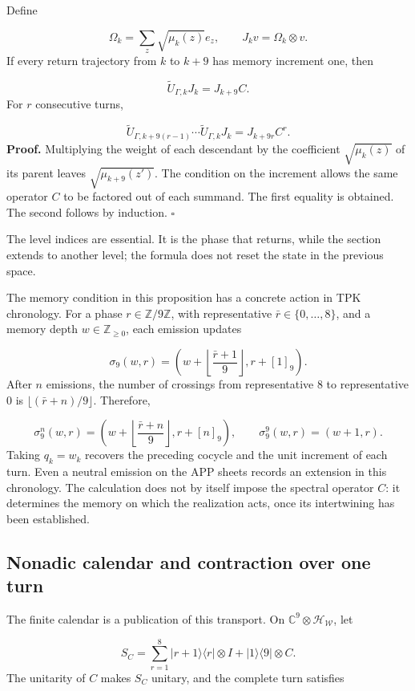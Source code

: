 Define

\[
\Omega_k=\sum_z\sqrt{\mu_k(z)}e_z,\qquad
J_kv=\Omega_k\otimes v.
\]
If every return trajectory from \(k\) to \(k+9\) has memory increment one, then

\[
\widetilde U_{\Gamma,k}J_k=J_{k+9}C.
\]
For \(r\) consecutive turns,

\[
\widetilde U_{\Gamma,k+9(r-1)}\cdots
\widetilde U_{\Gamma,k}J_k=J_{k+9r}C^r.
\]
\textbf{Proof.} Multiplying the weight of each descendant by the coefficient \(\sqrt{\mu_k(z)}\) of its parent leaves \(\sqrt{\mu_{k+9}(z')}\). The condition on the increment allows the same operator \(C\) to be factored out of each summand. The first equality is obtained. The second follows by induction. \hfill\(\square\)

The level indices are essential. It is the phase that returns, while the section extends to another level; the formula does not reset the state in the previous space.

The memory condition in this proposition has a concrete action in TPK chronology. For a phase \(r\in\mathbb Z/9\mathbb Z\), with representative \(\bar r\in\{0,\ldots,8\}\), and a memory depth \(w\in\mathbb Z_{\geq0}\), each emission updates

\[
\sigma_9(w,r)=
\left(w+\left\lfloor\frac{\bar r+1}{9}\right\rfloor,r+[1]_9\right).
\]
After \(n\) emissions, the number of crossings from representative \(8\) to representative \(0\) is \(\lfloor(\bar r+n)/9\rfloor\). Therefore,

\[
\sigma_9^n(w,r)=
\left(w+\left\lfloor\frac{\bar r+n}{9}\right\rfloor,r+[n]_9\right),
\qquad
\sigma_9^9(w,r)=(w+1,r).
\]
Taking \(q_k=w_k\) recovers the preceding cocycle and the unit increment of each turn. Even a neutral emission on the APP sheets records an extension in this chronology. The calculation does not by itself impose the spectral operator \(C\): it determines the memory on which the realization acts, once its intertwining has been established.

\subsection{Nonadic calendar and contraction over one turn}
\label{viii:rz:calendario}
The finite calendar is a publication of this transport. On \(\mathbb C^9\otimes\mathcal H_{\mathscr W}\), let

\[
S_C=\sum_{r=1}^{8}|r+1\rangle\langle r|\otimes I
+|1\rangle\langle9|\otimes C.
\]
The unitarity of \(C\) makes \(S_C\) unitary, and the complete turn satisfies

